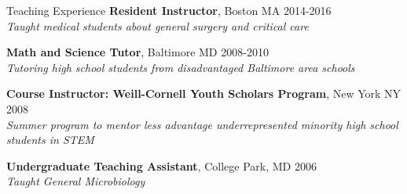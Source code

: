 \documentclass{resume} %
\begin{document}
\begin{rSection}{Teaching Experience}
   {\bf Resident Instructor}{, Boston MA} \hfill {2014-2016}
   \\ 
   \textit{Taught medical students about general surgery and critical care}
   
   {\bf Math and Science Tutor}{, Baltimore MD} \hfill {2008-2010}
   \\ 
   \textit{Tutoring high school students from disadvantaged Baltimore area schools}
   
   {\bf Course Instructor: Weill-Cornell Youth Scholars Program}{, New York NY} \hfill {2008}
   \\ 
   \textit{Summer program to mentor less advantage underrepresented minority high school students in STEM
   } 
   
   {\bf Undergraduate Teaching Assistant}{, College Park, MD} \hfill {2006}
   \\ 
   \textit{Taught General Microbiology}
   \end{rSection}
   
   
\end{document}
